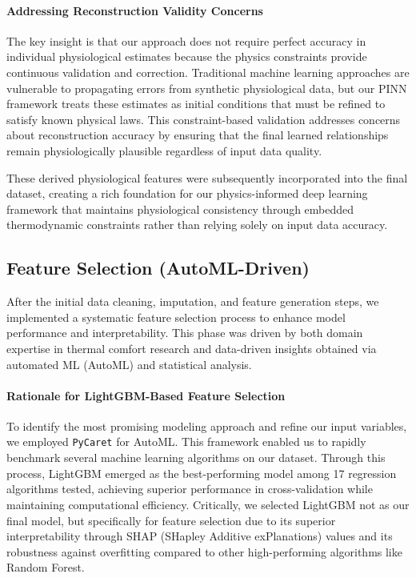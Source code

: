 \paragraph{Addressing Reconstruction Validity Concerns} The key insight is that our approach does not require perfect accuracy in individual physiological estimates because the physics constraints provide continuous validation and correction. Traditional machine learning approaches are vulnerable to propagating errors from synthetic physiological data, but our PINN framework treats these estimates as initial conditions that must be refined to satisfy known physical laws. This constraint-based validation addresses concerns about reconstruction accuracy by ensuring that the final learned relationships remain physiologically plausible regardless of input data quality.

These derived physiological features were subsequently incorporated into the final dataset, creating a rich foundation for our physics-informed deep learning framework that maintains physiological consistency through embedded thermodynamic constraints rather than relying solely on input data accuracy.

\subsection{Feature Selection (AutoML-Driven)}

After the initial data cleaning, imputation, and feature generation steps, we implemented a systematic feature selection process to enhance model performance and interpretability. This phase was driven by both domain expertise in thermal comfort research and data-driven insights obtained via automated ML (AutoML) and statistical analysis.

\paragraph{Rationale for LightGBM-Based Feature Selection} To identify the most promising modeling approach and refine our input variables, we employed \texttt{PyCaret} for AutoML. This framework enabled us to rapidly benchmark several machine learning algorithms on our dataset. Through this process, LightGBM emerged as the best-performing model among 17 regression algorithms tested, achieving superior performance in cross-validation while maintaining computational efficiency. Critically, we selected LightGBM not as our final model, but specifically for feature selection due to its superior interpretability through SHAP (SHapley Additive exPlanations) values and its robustness against overfitting compared to other high-performing algorithms like Random Forest.

